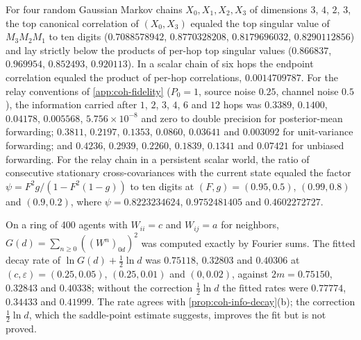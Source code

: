 \begin{numcheck}\label{chk:coh-relay}
For four random Gaussian Markov chains $X_0,X_1,X_2,X_3$ of dimensions $3$, $4$, $2$, $3$, the top canonical correlation of $(X_0,X_3)$ equaled the top singular value of $M_3M_2M_1$ to ten digits ($0.7088578942$, $0.8770328208$, $0.8179696032$, $0.8290112856$) and lay strictly below the products of per-hop top singular values ($0.866837$, $0.969954$, $0.852493$, $0.920113$). In a scalar chain of six hops the endpoint correlation equaled the product of per-hop correlations, $0.0014709787$. For the relay conventions of \cref{app:coh-fidelity} ($P_0=1$, source noise $0.25$, channel noise $0.5$), the information carried after $1$, $2$, $3$, $4$, $6$ and $12$ hops was $0.3389$, $0.1400$, $0.04178$, $0.005568$, $5.756\times10^{-8}$ and zero to double precision for posterior-mean forwarding; $0.3811$, $0.2197$, $0.1353$, $0.0860$, $0.03641$ and $0.003092$ for unit-variance forwarding; and $0.4236$, $0.2939$, $0.2260$, $0.1839$, $0.1341$ and $0.07421$ for unbiased forwarding. For the relay chain in a persistent scalar world, the ratio of consecutive stationary cross-covariances with the current state equaled the factor $\psi=F^2g/(1-F^2(1-g))$ to ten digits at $(F,g)=(0.95,0.5)$, $(0.99,0.8)$ and $(0.9,0.2)$, where $\psi=0.8223234624$, $0.9752481405$ and $0.4602272727$.
\end{numcheck}

\begin{numcheck}\label{chk:coh-info-decay}
On a ring of 400 agents with $W_{ii}=c$ and $W_{ij}=a$ for neighbors, $G(d)=\sum_{n\ge0}((W^n)_{0d})^2$ was computed exactly by Fourier sums. The fitted decay rate of $\ln G(d)+\frac12\ln d$ was $0.75118$, $0.32803$ and $0.40306$ at $(c,\varepsilon)=(0.25,0.05)$, $(0.25,0.01)$ and $(0,0.02)$, against $2m=0.75150$, $0.32843$ and $0.40338$; without the correction $\frac12\ln d$ the fitted rates were $0.77774$, $0.34433$ and $0.41999$. The rate agrees with \cref{prop:coh-info-decay}(b); the correction $\frac12\ln d$, which the saddle-point estimate suggests, improves the fit but is not proved.
\end{numcheck}

